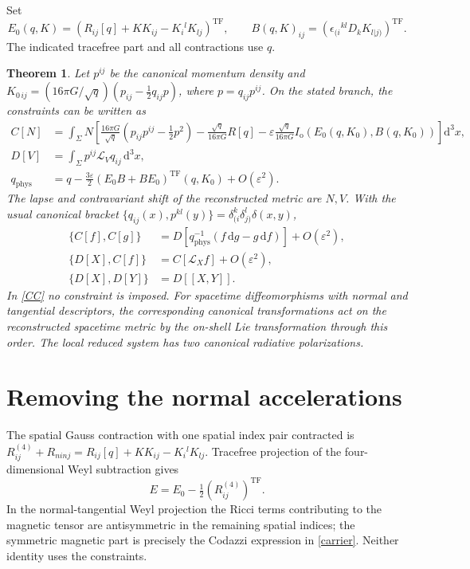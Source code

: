 \documentclass[11pt]{article}
\newtheorem{theorem}{Theorem}
\newcommand{\TF}{\mathop{\mathrm{TF}}}
\newcommand{\Lie}{\mathcal L}
\newcommand{\dd}{\mathrm d}
\newcommand{\PG}{16\pi G}
\newcommand{\ep}{\varepsilon}
\begin{document}
Set
\begin{equation}
 E_0(q,K)=(R_{ij}[q]+K K_{ij}-K_i{}^l K_{lj})^{\TF},\qquad
 B(q,K)_{ij}=(\epsilon_{(i}{}^{kl}D_kK_{l|j)})^{\TF}.
 \label{carrier}
\end{equation}
The indicated tracefree part and all contractions use \(q\).
\begin{theorem}
Let \(p^{ij}\) be the canonical momentum density and
\(K_{0\,ij}=(\PG/\sqrt q)(p_{ij}-\tfrac12 q_{ij}p)\), where \(p=q_{ij}p^{ij}\).
On the stated branch, the constraints can be written as
\begin{align}
 C[N]&=\int_\Sigma N\left[
 \frac{\PG}{\sqrt q}(p_{ij}p^{ij}-\tfrac12p^2)
 -\frac{\sqrt q}{\PG}R[q]
 -\ep\frac{\sqrt q}{\PG}I_{\mathrm o}(E_0(q,K_0),B(q,K_0))\right]\dd^3x,\label{C}\\
 D[V]&=\int_\Sigma p^{ij}\Lie_Vq_{ij}\,\dd^3x,\nonumber\\
 q_{\mathrm{phys}}&=q-\frac{3\ep}{2}
       (E_0B+BE_0)^{\TF}(q,K_0)+O(\ep^2).                         \label{qphys}
\end{align}
The lapse and contravariant shift of the reconstructed metric are \(N,V\). With the usual canonical bracket \(\{q_{ij}(x),p^{kl}(y)\}=\delta_{(i}^{k}\delta_{j)}^{l}\delta(x,y)\),
\begin{align}
 \{C[f],C[g]\}&=D[q_{\mathrm{phys}}^{-1}(f\,\dd g-g\,\dd f)]+O(\ep^2),\label{CC}\\
 \{D[X],C[f]\}&=C[\Lie_X f]+O(\ep^2),\\
 \{D[X],D[Y]\}&=D[[X,Y]] .
\end{align}
In \eqref{CC} no constraint is imposed. For spacetime diffeomorphisms with normal and tangential descriptors, the corresponding canonical transformations act on the reconstructed spacetime metric by the on-shell Lie transformation through this order. The local reduced system has two canonical radiative polarizations.
\end{theorem}

\section{Removing the normal accelerations}
The spatial Gauss contraction with one spatial index pair contracted is
\(
 R^{(4)}_{ij}+R_{ninj}
 =R_{ij}[q]+K K_{ij}-K_i{}^l K_{lj}.
\)
Tracefree projection of the four-dimensional Weyl subtraction gives
\begin{equation}
 E=E_0-\tfrac12(R^{(4)}_{ij})^{\TF}.
 \label{gauss}
\end{equation}
In the normal-tangential Weyl projection the Ricci terms contributing to the magnetic tensor are antisymmetric in the remaining spatial indices; the symmetric magnetic part is precisely the Codazzi expression in \eqref{carrier}. Neither identity uses the constraints.
\end{document}
